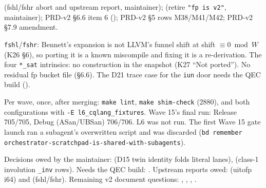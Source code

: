  (fshl/fshr abort and upstream report, maintainer);
 (retire \texttt{"fp is v2"}, maintainer); PRD-v2 \S6.6 item 6
(); PRD-v2 \S5 rows M38/M41/M42; PRD-v2 \S7.9 amendment.

\texttt{fshl}/\texttt{fshr}: Bennett's expansion is not LLVM's funnel shift at
shift $\equiv 0 \bmod W$ (K26 \S6), so porting it is a known miscompile and
fixing it is a re-derivation.  The four \texttt{*\_sat} intrinsics: no
construction in the snapshot (K27 ``Not ported'').  No residual fp bucket file
(\S6.6).  The D21 trace case for the \texttt{iun} door needs the QEC build
().

Per wave, once, after merging: \texttt{make lint}, \texttt{make shim-check}
(2880), and both configurations with \texttt{-E l6\_cqlang\_fixtures}.  Wave 15's
final run: Release 705/705, Debug (ASan/UBSan) 706/706.  L6 was not run.  The
first Wave 15 gate launch ran a subagent's overwritten script and was discarded
(\texttt{bd remember orchestrator-scratchpad-is-shared-with-subagents}).

Decisions owed by the maintainer:  (D15 twin identity folds
literal lanes),  (class-1 involution \texttt{\_inv} rows).  Needs the QEC
build: .  Upstream reports owed:  (uitofp i64) and
 (fshl/fshr).  Remaining v2 document questions: ,
, , .
